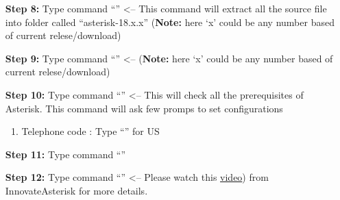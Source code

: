 \begin{itemize}[leftmargin=1.7cm]
			\item[\textbf{Step 8:}] Type command ``{\selectfont{tar -xvf asterisk-18-current.tar.gz}}'' <-- This command will extract all the source file into folder called ``asterisk-18.x.x'' (\textbf{Note:} here `x' could be any number based of current relese/download)
			
			\item[\textbf{Step 9:}] Type command ``{\selectfont{cd asterisk-18.x.x}}'' <-- (\textbf{Note:} here `x' could be any number based of current relese/download)
			
			\item[\textbf{Step 10:}] Type command ``{\selectfont{sudo contrib/scripts/install\_prereq install}}'' <-- This will check all the prerequisites of Asterisk. This command will ask few promps to set configurations
					\begin{enumerate}
						\item Telephone code : Type ``{\selectfont{1}}'' for US
					\end{enumerate}
			\item[\textbf{Step 11:}] Type command ``{\selectfont{sudo ./configure --libdir=/usr/lib --with-pjproject-bundled}}''
			
			\item[\textbf{Step 12:}] Type command ``{\selectfont{sudo make menuselect}}'' <-- Please watch this \href{https://www.youtube.com/watch?v=52sEPVPV9JE&list=PLruX0IBTg1G4Auvo5YhoJKgskmMP7b8bJ&index=4&ab_channel=InnovateAsterisk}{video}) from InnovateAsterisk for more details.


\end{itemize}
